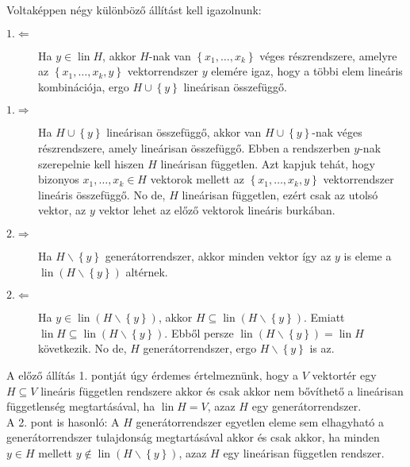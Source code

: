 \documentclass[a4paper, showtrims]{memoir}
\makeatletter
\renewenvironment{proof}[1][\proofname]
    {\par\pushQED{\qed}%
    \normalfont \topsep6\p@\@plus6\p@\relax
    \trivlist
    \item[\hskip\labelsep
        \itshape
    #1\@addpunct{:}]\ignorespaces}
    {\popQED\endtrivlist\@endpefalse}
\theoremstyle{plain}
\theoremstyle{remark}
\theoremstyle{definition}
\DeclareMathOperator{\lin}{lin}
\makeatother
\begin{document}
\begin{proof}
    Voltaképpen négy különböző állítást kell igazolnunk:
    \begin{description}
        \item[$1.\Leftarrow$]
            Ha $y\in\lin H$, akkor $H$-nak van $\left\{ x_1,\ldots,x_k \right\}$ véges részrendszere,
            amelyre az $\left\{ x_1,\ldots,x_k,y \right\}$ vektorrendszer $y$ elemére igaz, hogy a többi elem lineáris kombinációja,
            ergo $H\cup\left\{ y \right\}$ lineárisan összefüggő.
        \item[$1.\Rightarrow$]
            Ha $H\cup\left\{ y \right\}$ lineárisan összefüggő, akkor van $H\cup\left\{ y \right\}$-nak véges részrendszere, amely lineárisan összefüggő.
            Ebben a rendszerben $y$-nak szerepelnie kell hiszen $H$ lineárisan független.
            Azt kapjuk tehát, hogy bizonyos $x_1,\ldots,x_k\in H$ vektorok mellett az $\left\{ x_1,\ldots,x_k,y \right\}$ vektorrendszer lineáris összefüggő.
            No de, $H$ lineárisan független, ezért csak az utolsó vektor, az $y$ vektor lehet az előző vektorok lineáris burkában.
        \item[$2.\Rightarrow$]
            Ha $H\smallsetminus\left\{ y \right\}$ generátorrendszer, akkor minden vektor így az $y$ is eleme a $\lin\left( H\smallsetminus\left\{ y \right\} \right)$ altérnek.
        \item[$2.\Leftarrow$]
            Ha $y\in\lin\left( H\smallsetminus\left\{ y \right\} \right)$, akkor $H\subseteq\lin\left( H\smallsetminus\left\{ y \right\} \right)$.
            Emiatt $\lin H\subseteq\lin\left( H\smallsetminus\left\{ y \right\} \right)$.
            Ebből persze $\lin\left( H\smallsetminus\left\{ y \right\} \right)=\lin H$ következik.
            No de, $H$ generátorrendszer, ergo $H\smallsetminus\left\{ y \right\}$ is az.
            \qedhere
    \end{description}
\end{proof}
A előző állítás 1. pontját úgy érdemes értelmeznünk, hogy a $V$ vektortér egy $H\subseteq V$ lineáris független rendszere akkor és csak akkor nem bővíthető a lineárisan függetlenség megtartásával, ha $\lin H=V$, azaz $H$ egy generátorrendszer.
\\
A 2. pont is hasonló: A $H$ generátorrendszer egyetlen eleme sem elhagyható a generátorrendszer tulajdonság megtartásával akkor és csak akkor, ha minden $y\in H$ mellett $y\notin\lin\left( H\smallsetminus\left\{y \right\} \right)$, azaz $H$ egy lineárisan független rendszer.
\end{document}
